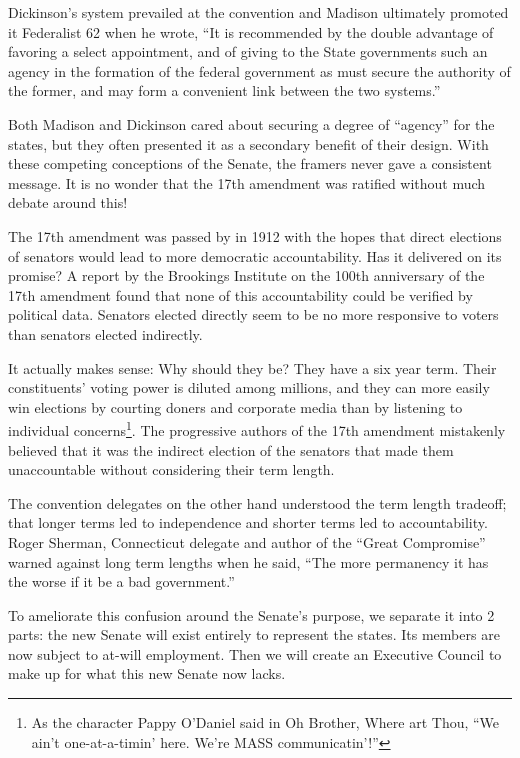 \documentclass{article}
\newcommand{\quotes}[1]{``#1''}
\begin{document}
Dickinson's system prevailed at the convention and Madison ultimately promoted it Federalist 62 when he wrote, \quotes{It is recommended by the double advantage of favoring a select appointment, and of giving to the State governments such an agency in the formation of the federal government as must secure the authority of the former, and may form a convenient link between the two systems.}\cite{Federalist62}

Both Madison and Dickinson cared about securing a degree of \quotes{agency} for the states, but they often presented it as a secondary benefit of their design. With these competing conceptions of the Senate, the framers never gave a consistent message. It is no wonder that the 17th amendment was ratified without much debate around this!

The 17th amendment was passed by in 1912 with the hopes that direct elections of senators would lead to more democratic accountability\cite{Eisinger}. Has it delivered on its promise? A report by the Brookings Institute on the 100th anniversary of the 17th amendment found that none of this accountability could be verified by political data\cite{Schiller}. Senators elected directly seem to be no more responsive to voters than senators elected indirectly.

It actually makes sense: Why should they be? They have a six year term. Their constituents' voting power is diluted among millions, and they can more easily win elections by courting doners and corporate media than by listening to individual concerns\footnote{As the character Pappy O'Daniel said in Oh Brother, Where art Thou, \quotes{We ain't one-at-a-timin' here. We're MASS communicatin'!}}. The progressive authors of the 17th amendment mistakenly believed that it was the indirect election of the senators that made them unaccountable without considering their term length.

The convention delegates on the other hand understood the term length tradeoff; that longer terms led to independence and shorter terms led to accountability. Roger Sherman, Connecticut delegate and author of the \quotes{Great Compromise} warned against long term lengths when he said, \quotes{The more permanency it has the worse if it be a bad government.}\cite{Madison}

To ameliorate this confusion around the Senate's purpose, we separate it into 2 parts: the new Senate will exist entirely to represent the states. Its members are now subject to at-will employment. Then we will create an Executive Council to make up for what this new Senate now lacks.
\end{document}
